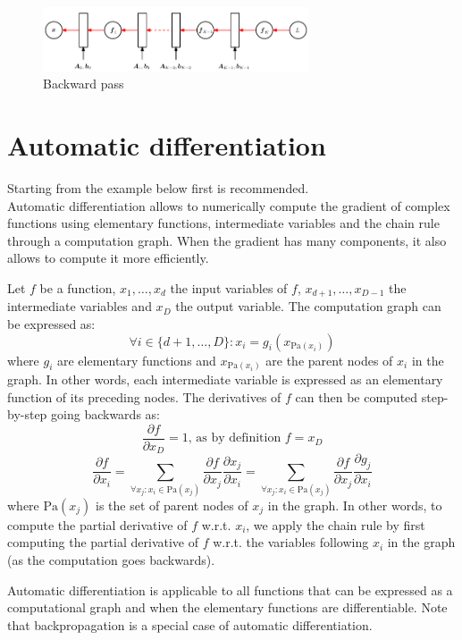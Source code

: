 \begin{figure}[ht]
    \centering
    \includegraphics[width=0.7\textwidth]{img/_backward_pass.pdf}
    \caption{Backward pass}
\end{figure}



\section{Automatic differentiation}
Starting from the example below first is recommended.\\

Automatic differentiation allows to numerically compute 
the gradient of complex functions using elementary functions, intermediate variables and the chain rule through a computation graph.
When the gradient has many components, it also allows to compute it more efficiently.

Let $f$ be a function,
$x_1, \dots, x_d$ the input variables of $f$,
$x_{d+1}, \dots, x_{D-1}$ the intermediate variables and
$x_D$ the output variable.
The computation graph can be expressed as:
\[
    \forall i \in \{ d+1, \dots, D \}: x_i = g_i(x_{\text{Pa}(x_i)})
\]
where $g_i$ are elementary functions and $x_{\text{Pa}(x_i)}$ are the parent nodes of $x_i$ in the graph.
In other words, each intermediate variable is expressed as an elementary function of its preceding nodes.
The derivatives of $f$ can then be computed step-by-step going backwards as:
\[ \frac{\partial f}{\partial x_D} = 1 \text{, as by definition } f = x_D \]
\[ 
    \frac{\partial f}{\partial x_i} = \sum_{\forall x_j: x_i \in \text{Pa}(x_j)} \frac{\partial f}{\partial x_j} \frac{\partial x_j}{\partial x_i}
        = \sum_{\forall x_j: x_i \in \text{Pa}(x_j)} \frac{\partial f}{\partial x_j} \frac{\partial g_j}{\partial x_i}
\]
where $\text{Pa}(x_j)$ is the set of parent nodes of $x_j$ in the graph.
In other words, to compute the partial derivative of $f$ w.r.t. $x_i$, 
we apply the chain rule by first computing 
the partial derivative of $f$ w.r.t. the variables following $x_i$ in the graph (as the computation goes backwards).

Automatic differentiation is applicable to all functions that can be expressed as a computational graph and 
when the elementary functions are differentiable.
Note that backpropagation is a special case of automatic differentiation.

